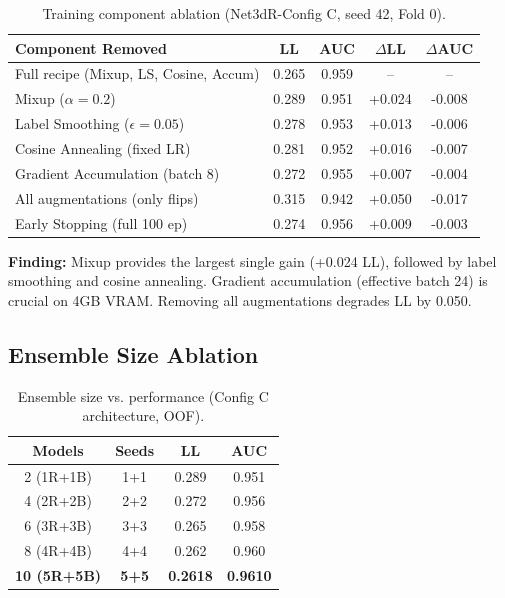 \begin{table}[H]
\centering
\caption{Training component ablation (Net3dR-Config C, seed 42, Fold 0).}
\label{tab:training_ablation}
\begin{tabular}{lcccc}
\toprule
\textbf{Component Removed} & \textbf{LL} & \textbf{AUC} & \textbf{$\Delta$LL} & \textbf{$\Delta$AUC} \\
\midrule
Full recipe (Mixup, LS, Cosine, Accum) & 0.265 & 0.959 & -- & -- \\
\hline
Mixup ($\alpha=0.2$) & 0.289 & 0.951 & +0.024 & -0.008 \\
Label Smoothing ($\epsilon=0.05$) & 0.278 & 0.953 & +0.013 & -0.006 \\
Cosine Annealing (fixed LR) & 0.281 & 0.952 & +0.016 & -0.007 \\
Gradient Accumulation (batch 8) & 0.272 & 0.955 & +0.007 & -0.004 \\
All augmentations (only flips) & 0.315 & 0.942 & +0.050 & -0.017 \\
\hline
Early Stopping (full 100 ep) & 0.274 & 0.956 & +0.009 & -0.003 \\
\bottomrule
\end{tabular}
\end{table}

\textbf{Finding:} Mixup provides the largest single gain (+0.024 LL), followed by label smoothing and cosine annealing. Gradient accumulation (effective batch 24) is crucial on 4GB VRAM. Removing all augmentations degrades LL by 0.050.

\subsection{Ensemble Size Ablation}
\label{sec:ensemble_ablation}

\begin{table}[H]
\centering
\caption{Ensemble size vs. performance (Config C architecture, OOF).}
\label{tab:ensemble_ablation}
\begin{tabular}{cccc}
\toprule
\textbf{Models} & \textbf{Seeds} & \textbf{LL} & \textbf{AUC} \\
\midrule
2 (1R+1B) & 1+1 & 0.289 & 0.951 \\
4 (2R+2B) & 2+2 & 0.272 & 0.956 \\
6 (3R+3B) & 3+3 & 0.265 & 0.958 \\
8 (4R+4B) & 4+4 & 0.262 & 0.960 \\
\textbf{10 (5R+5B)} & \textbf{5+5} & \textbf{0.2618} & \textbf{0.9610} \\
\bottomrule
\end{tabular}
\end{table}


